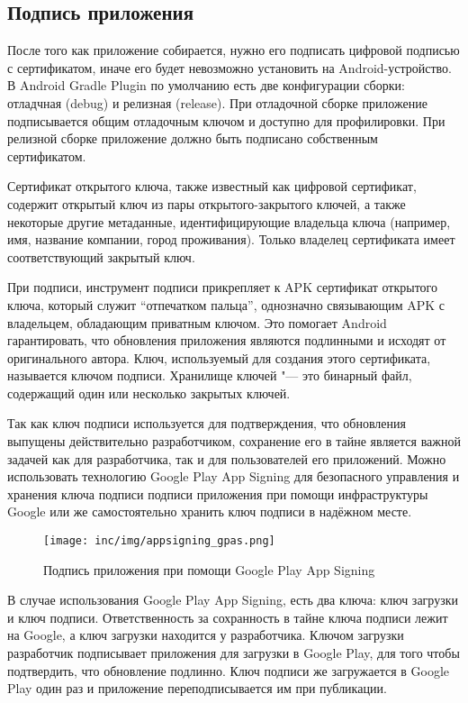 \subsection{Подпись приложения}
\label{subsec:signing}

После того как приложение собирается, нужно его подписать цифровой подписью с сертификатом, иначе его будет невозможно установить на Android-устройство.
В Android Gradle Plugin по умолчанию есть две конфигурации сборки: отладчная (debug) и релизная (release).
При отладочной сборке приложение подписывается общим отладочным ключом и доступно для профилировки.
При релизной сборке приложение должно быть подписано собственным сертификатом.

Сертификат открытого ключа, также известный как цифровой сертификат, содержит открытый ключ из пары открытого-закрытого ключей, а также некоторые другие метаданные, идентифицирующие владельца ключа (например, имя, название компании, город проживания).
Только владелец сертификата имеет соответствующий закрытый ключ.

При подписи, инструмент подписи прикрепляет к APK сертификат открытого ключа, который служит ``отпечатком пальца'', однозначно связывающим APK с владельцем, обладающим приватным ключом.
Это помогает Android гарантировать, что обновления приложения являются подлинными и исходят от оригинального автора.
Ключ, используемый для создания этого сертификата, называется ключом подписи.
Хранилище ключей "--- это бинарный файл, содержащий один или несколько закрытых ключей.

Так как ключ подписи используется для подтверждения, что обновления выпущены действительно разработчиком, сохранение его в тайне является важной задачей как для разработчика, так и для пользователей его приложений.
Можно использовать технологию Google Play App Signing для безопасного управления и хранения ключа подписи подписи приложения при помощи инфраструктуры Google или же самостоятельно хранить ключ подписи в надёжном месте.

\begin{figure}[ht]
  \texttt{[image: inc/img/appsigning\_gpas.png]}
  \caption{Подпись приложения при помощи Google Play App Signing}
  \label{fig:appsigningGpas}
\end{figure}

В случае использования Google Play App Signing, есть два ключа: ключ загрузки и ключ подписи.
Ответственность за сохранность в тайне ключа подписи лежит на Google, а ключ загрузки находится у разработчика.
Ключом загрузки разработчик подписывает приложения для загрузки в Google Play, для того чтобы подтвердить, что обновление подлинно.
Ключ подписи же загружается в Google Play один раз и приложение переподписывается им при публикации.

